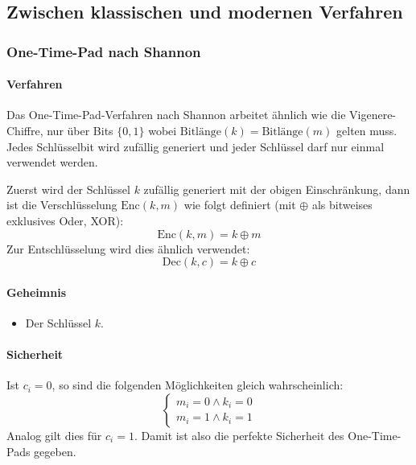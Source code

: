 \documentclass[a4paper, 11pt, accentcolor = tud3b]{tudreport}
\newcommand{\Enc}{\ensuremath{\textrm{Enc}}}
\newcommand{\Dec}{\ensuremath{\textrm{Dec}}}
\begin{document}
            \subsection{Zwischen klassischen und modernen Verfahren}
                \subsubsection{One-Time-Pad nach Shannon}
                    \paragraph{Verfahren}
	                    Das One-Time-Pad-Verfahren nach Shannon arbeitet ähnlich wie die Vigenere-Chiffre, nur über Bits \( \{ 0, 1 \} \) wobei \( \textrm{Bitlänge}(k) = \textrm{Bitlänge}(m) \) gelten muss. Jedes Schlüsselbit wird zufällig generiert und jeder Schlüssel darf nur einmal verwendet werden.
	                    
	                    Zuerst wird der Schlüssel \( k \) zufällig generiert mit der obigen Einschränkung, dann ist die Verschlüsselung \( \Enc(k, m) \) wie folgt definiert (mit \(\oplus\) als bitweises exklusives Oder, XOR):
	                    \begin{equation*}
		                    \Enc(k, m) = k \oplus m
	                    \end{equation*}
	                    Zur Entschlüsselung wird dies ähnlich verwendet:
	                    \begin{equation*}
		                    \Dec(k, c) = k \oplus c
	                    \end{equation*}
                    
                    \paragraph{Geheimnis}
	                    \begin{itemize}
	                    	\item Der Schlüssel \(k\).
	                    \end{itemize}
                    
                    \paragraph{Sicherheit}
	                    Ist \( c_i = 0 \), so sind die folgenden Möglichkeiten gleich wahrscheinlich:
	                    \begin{equation*}
		                    \begin{cases*}
			                    m_i = 0 \land k_i = 0 \\
			                    m_i = 1 \land k_i = 1
		                    \end{cases*}
	                    \end{equation*}
	                    Analog gilt dies für \( c_i = 1 \). Damit ist also die perfekte Sicherheit des One-Time-Pads gegeben.
                    
\end{document}
